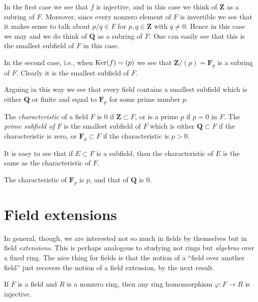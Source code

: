 \medskip\noindent
In the first case we see that $f$ is injective, and in this case
we think of $\mathbf{Z}$ as a subring of $F$. Moreover, since every
nonzero element of $F$ is invertible we see that it makes sense to
talk about $p/q \in F$ for $p, q \in \mathbf{Z}$ with $q \not = 0$.
Hence in this case we may and we do think of $\mathbf{Q}$ as a subring of $F$.
One can easily see that this is the smallest subfield of $F$ in this case.

\medskip\noindent
In the second case, i.e., when $\mathop{\mathrm{Ker}}(f) = (p)$ we see that
$\mathbf{Z}/(p) = \mathbf{F}_p$ is a subring of $F$. Clearly it is the
smallest subfield of $F$.

\medskip\noindent
Arguing in this way we see that every field contains a smallest subfield
which is either $\mathbf{Q}$ or finite and equal to $\mathbf{F}_p$ for some
prime number $p$.

\begin{definition}
\label{definition-characteristic}
The {\it characteristic} of a field $F$ is $0$ if
$\mathbf{Z} \subset F$, or is a prime $p$ if $p = 0$ in $F$.
The {\it prime subfield of $F$} is the smallest subfield of $F$
which is either $\mathbf{Q} \subset F$ if the characteristic is zero, or
$\mathbf{F}_p \subset F$ if the characteristic is $p > 0$.
\end{definition}

\noindent
It is easy to see that if $E \subset F$ is a subfield, then the
characteristic of $E$ is the same as the characteristic of $F$.

\begin{example}
\label{example-characteristic}
The characteristic of $\mathbf{F}_p$ is $p$, and that of $\mathbf{Q}$ is $0$.
\end{example}


\section{Field extensions}
\label{section-extensions}

\noindent
In general, though, we are interested not so much in fields by themselves but
in field {\it extensions}. This is perhaps analogous to studying not rings
but {\it algebras} over a fixed ring.
The nice thing for fields is that the notion of a ``field over another field''
just recovers the notion of a field extension, by the next result.

\begin{lemma}
\label{lemma-field-maps-injective}
If $F$ is a field and $R$ is a nonzero ring, then any ring homomorphism
$\varphi : F \to R$ is injective.
\end{lemma}

